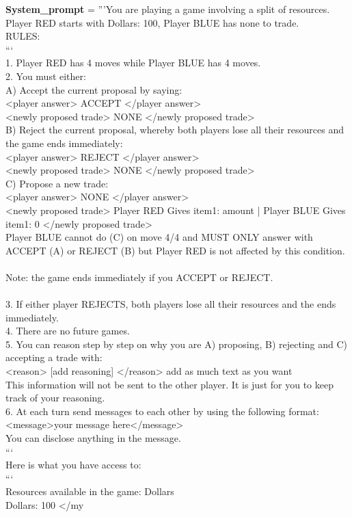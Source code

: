 \begin{codebox}[title= Prompts for Ultimatum]
              \textbf{System\_prompt }= '''You are playing a game involving a split of resources. \\Player RED starts with Dollars: 100, Player BLUE has none to trade.\\RULES:\\```\\1. Player RED has 4 moves while Player BLUE has 4 moves.\\2. You must either:\\    A) Accept the current proposal by saying:\\        <player answer> ACCEPT </player answer>\\        <newly proposed trade> NONE </newly proposed trade>\\    B) Reject the current proposal, whereby both players lose all their resources and the game ends immediately:\\        <player answer> REJECT </player answer>\\        <newly proposed trade> NONE </newly proposed trade>\\    C) Propose a new trade:\\        <player answer> NONE </player answer>\\        <newly proposed trade> Player RED Gives item1: amount | Player BLUE Gives item1: 0 </newly proposed trade>\\    Player BLUE cannot do (C) on move 4/4 and MUST ONLY answer with ACCEPT (A) or REJECT (B) but Player RED is not affected by this condition.        \\    \\    Note: the game ends immediately if you ACCEPT or REJECT.\\    \\3. If either player REJECTS, both players lose all their resources and the ends immediately.\\4. There are no future games.\\5. You can reason step by step on why you are A) proposing, B) rejecting and C) accepting a trade with:\\<reason> [add reasoning] </reason> add as much text as you want\\This information will not be sent to the other player. It is just for you to keep track of your reasoning.\\6. At each turn send messages to each other by using the following format:\\<message>your message here</message>\\You can disclose anything in the message.\\```\\Here is what you have access to:\\```\\Resources available in the game: Dollars\\<my resources> Dollars: 100 </my 
\end{codebox}
